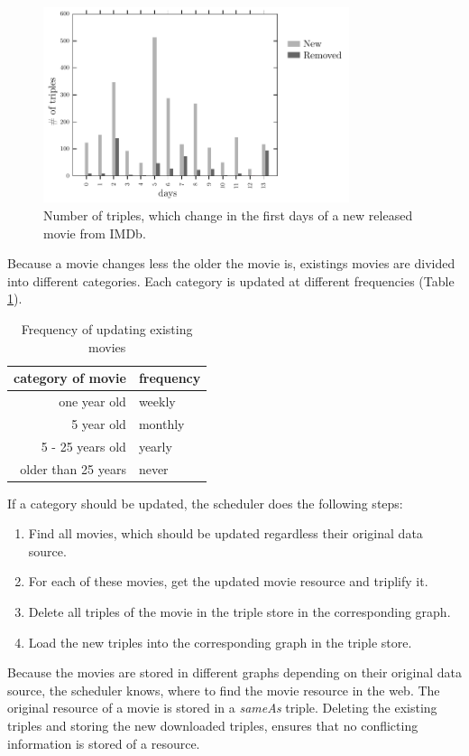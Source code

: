 \begin{figure}[h!]
  \begin{center}
  \includegraphics[width=0.8\textwidth]{images/updating_2.pdf}
  \end{center}
  \caption{Number of triples, which change in the first days of a new released movie from IMDb.}
  \label{fig_new_movie}
\end{figure}

Because a movie changes less the older the movie is, existings movies are divided into different categories.
Each category is updated at different frequencies (Table \ref{tab_updating_existing}).
\begin{table}[ht]
	\begin{center}
	\begin{tabular}{rl}
		\textbf{category of movie} & \textbf{frequency} \\ \hline
		one year old & weekly \\
		5 year old & monthly \\
		5 - 25 years old & yearly \\
		older than 25 years & never \\
	\end{tabular}
	\end{center}
	\caption{Frequency of updating existing movies}
	\label{tab_updating_existing}
\end{table}
If a category should be updated, the scheduler does the following steps:
\begin{enumerate}
	\item Find all movies, which should be updated regardless their original data source.
	\item For each of these movies, get the updated movie resource and triplify it.
	\item Delete all triples of the movie in the triple store in the corresponding graph.
	\item Load the new triples into the corresponding graph in the triple store.
\end{enumerate}
Because the movies are stored in different graphs depending on their original data source, the scheduler knows, where to find the movie resource in the web.
The original resource of a movie is stored in a \emph{sameAs} triple.
Deleting the existing triples and storing the new downloaded triples, ensures that no conflicting information is stored of a resource.